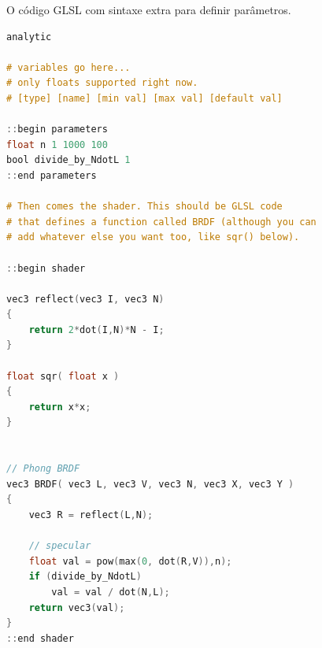 \begin{codigo}[h]
    \caption{\small \small O código GLSL com sintaxe extra para definir parâmetros. }
    \label{cod-disney-code}
\begin{lstlisting}[language=C, frame=none, inputencoding=utf8]
analytic

# variables go here...
# only floats supported right now.
# [type] [name] [min val] [max val] [default val]

::begin parameters
float n 1 1000 100
bool divide_by_NdotL 1
::end parameters

# Then comes the shader. This should be GLSL code
# that defines a function called BRDF (although you can
# add whatever else you want too, like sqr() below).

::begin shader

vec3 reflect(vec3 I, vec3 N)
{
    return 2*dot(I,N)*N - I;
}

float sqr( float x )
{
    return x*x;
}


// Phong BRDF
vec3 BRDF( vec3 L, vec3 V, vec3 N, vec3 X, vec3 Y )
{
    vec3 R = reflect(L,N);

    // specular
    float val = pow(max(0, dot(R,V)),n);
    if (divide_by_NdotL)
        val = val / dot(N,L);
    return vec3(val);
}
::end shader
\end{lstlisting}
\end{codigo}


